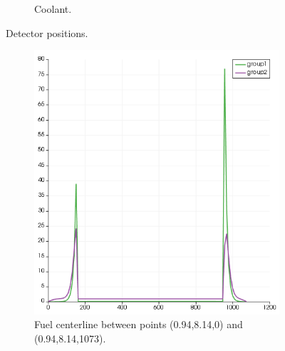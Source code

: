\documentclass[11pt,letterpaper]{article}
\begin{document}
\begin{figure}[htbp!]
\begin{subfigure}[t]{0.4\textwidth}
			\caption{Coolant.}
		\end{subfigure}
		\hfill
		\caption{Detector positions.}
		\label{fig:3D-assembly1}
	\end{figure}

	\begin{figure}[htbp!]
		\centering
		\begin{subfigure}[t]{0.4\textwidth}
			\centering
			\includegraphics[width=\linewidth]{3D-assembly1}
			\caption{Fuel centerline between points (0.94,8.14,0) and (0.94,8.14,1073).}
		\end{subfigure}
		\begin{subfigure}[t]{0.4\textwidth}
			\centering

\end{subfigure}
\end{figure}
\end{document}
